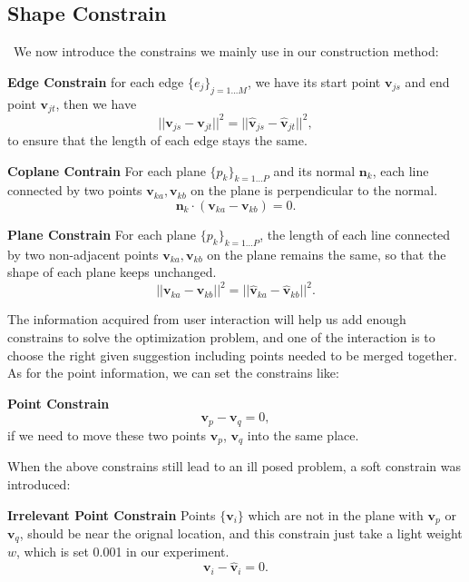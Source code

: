 \documentclass[submission]{gmp2018}
\begin{document}
\subsection{Shape Constrain}\
We now introduce the constrains we mainly use in our construction method:

\noindent
\textbf{Edge Constrain} for each edge $\{e_j\}_{j=1...M}$, we have its start point $\mathbf{v}_{js}$ and end point $\mathbf{v}_{jt}$, then we have 
\begin{equation}
||\mathbf{v}_{js} - \mathbf{v}_{jt}||^2 = ||\mathbf{\hat{v}}_{js} - \mathbf{\hat{v}}_{jt}||^2,
\label{equ:edge}
\end{equation}
to ensure that the length of each edge stays the same.

\noindent
\textbf{Coplane Contrain} For each plane $\{p_k\}_{k=1 \dots P}$ and its normal $\mathbf{n}_k$, each line connected by two points $\mathbf{v}_{ka}, \mathbf{v}_{kb}$ on the plane is perpendicular to the normal.
\begin{equation}
\mathbf{n}_k \cdot (\mathbf{v}_{ka} - \mathbf{v}_{kb}) = 0.
\label{equ:coplane}
\end{equation}

\noindent
\textbf{Plane Constrain} For each plane $\{p_k\}_{k=1 \dots P}$, the length of each line connected by two non-adjacent points $\mathbf{v}_{ka}, \mathbf{v}_{kb}$ on the plane remains the same, so that the shape of each plane keeps unchanged.
\begin{equation}
||\mathbf{v}_{ka} - \mathbf{v}_{kb}||^2 = ||\hat{\mathbf{v}}_{ka} - \hat{\mathbf{v}}_{kb}||^2.
\label{equ:plane}
\end{equation}

The information acquired from user interaction will help us add enough constrains to solve the optimization problem, and one of the interaction is to choose the right given suggestion including points needed to be merged together. As for the point information, we can set the constrains like:

\noindent
\textbf{Point Constrain} 
\begin{equation}
\mathbf{v}_p - \mathbf{v}_q = 0,
\label{equ:point}
\end{equation}
if we need to move these two points $\mathbf{v}_p$, $\mathbf{v}_q$ into the same place.

When the above constrains still lead to an ill posed problem, a soft constrain was introduced:

\noindent
\textbf{Irrelevant Point Constrain} Points $\{\mathbf{v}_i\}$ which are not in the plane with $\mathbf{v}_p$ or $\mathbf{v}_q$, should be near the orignal location, and this constrain just take a light weight $w$, which is set 0.001 in our experiment. 
\begin{equation}
\mathbf{v}_i - \mathbf{\hat{v}}_i = 0.
\label{equ:irrelevant}
\end{equation}
\end{document}
